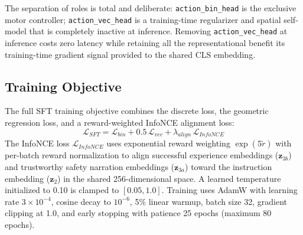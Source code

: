 \documentclass[letterpaper]{article} %
\begin{document}
The separation of roles is total and deliberate: \texttt{action\_bin\_head} is the exclusive motor controller; \texttt{action\_vec\_head} is a training-time regularizer and spatial self-model that is completely inactive at inference. Removing \texttt{action\_vec\_head} at inference costs zero latency while retaining all the representational benefit its training-time gradient signal provided to the shared CLS embedding.

\subsection{Training Objective}

The full SFT training objective combines the discrete loss, the geometric regression loss, and a reward-weighted InfoNCE \cite{oord2018infonce} alignment loss:
\begin{equation}
\mathcal{L}_{SFT} = \mathcal{L}_{bin} + 0.5\,\mathcal{L}_{vec} + \lambda_{align}\,\mathcal{L}_{InfoNCE}
\end{equation}
The InfoNCE loss $\mathcal{L}_{InfoNCE}$ uses exponential reward weighting $\exp(5\tilde{r})$ with per-batch reward normalization to align successful experience embeddings ($\mathbf{z}_{3b}$) and trustworthy safety narration embeddings ($\mathbf{z}_{3a}$) toward the instruction embedding ($\mathbf{z}_2$) in the shared 256-dimensional space. A learned temperature initialized to 0.10 is clamped to $[0.05, 1.0]$. Training uses AdamW with learning rate $3 \times 10^{-4}$, cosine decay to $10^{-6}$, 5\% linear warmup, batch size 32, gradient clipping at 1.0, and early stopping with patience 25 epochs (maximum 80 epochs).
\end{document}
